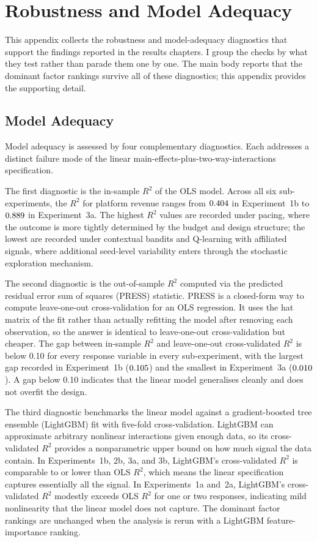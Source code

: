 \chapter{Robustness and Model Adequacy}
\label{ch:robustness}

This appendix collects the robustness and model-adequacy diagnostics that support the findings reported in the results chapters. I group the checks by what they test rather than parade them one by one. The main body reports that the dominant factor rankings survive all of these diagnostics; this appendix provides the supporting detail.

\section{Model Adequacy}
\label{sec:app_adequacy}

Model adequacy is assessed by four complementary diagnostics. Each addresses a distinct failure mode of the linear main-effects-plus-two-way-interactions specification.

The first diagnostic is the in-sample $R^2$ of the OLS model. Across all six sub-experiments, the $R^2$ for platform revenue ranges from $0.404$ in Experiment~1b to $0.889$ in Experiment~3a. The highest $R^2$ values are recorded under pacing, where the outcome is more tightly determined by the budget and design structure; the lowest are recorded under contextual bandits and Q-learning with affiliated signals, where additional seed-level variability enters through the stochastic exploration mechanism.

The second diagnostic is the out-of-sample $R^2$ computed via the predicted residual error sum of squares (PRESS) statistic. PRESS is a closed-form way to compute leave-one-out cross-validation for an OLS regression. It uses the hat matrix of the fit rather than actually refitting the model after removing each observation, so the answer is identical to leave-one-out cross-validation but cheaper. The gap between in-sample $R^2$ and leave-one-out cross-validated $R^2$ is below 0.10 for every response variable in every sub-experiment, with the largest gap recorded in Experiment~1b ($0.105$) and the smallest in Experiment~3a ($0.010$). A gap below 0.10 indicates that the linear model generalises cleanly and does not overfit the design.

The third diagnostic benchmarks the linear model against a gradient-boosted tree ensemble (LightGBM) fit with five-fold cross-validation. LightGBM can approximate arbitrary nonlinear interactions given enough data, so its cross-validated $R^2$ provides a nonparametric upper bound on how much signal the data contain. In Experiments~1b, 2b, 3a, and 3b, LightGBM's cross-validated $R^2$ is comparable to or lower than OLS $R^2$, which means the linear specification captures essentially all the signal. In Experiments~1a and~2a, LightGBM's cross-validated $R^2$ modestly exceeds OLS $R^2$ for one or two responses, indicating mild nonlinearity that the linear model does not capture. The dominant factor rankings are unchanged when the analysis is rerun with a LightGBM feature-importance ranking.

